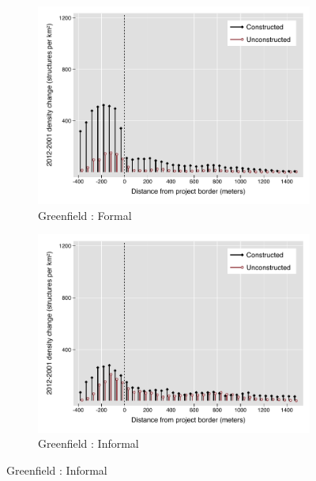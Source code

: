 \documentclass[12pt]{article}
\begin{document}
\begin{figure}
\caption{Separately by Project Type}
        \begin{subfigure}[b]{0.495\textwidth}
            \centering
        \caption{Greenfield : Formal}
            \includegraphics[width=\textwidth,trim={0.3cm .3cm 0.1cm 0cm}, clip=true]{figures/bblu_for_rawchanges_4_1}
        \end{subfigure}
        \hfill
        \begin{subfigure}[b]{0.495\textwidth}  
            \centering 
        \caption{Greenfield : Informal}
            \includegraphics[width=\textwidth,trim={0.3cm .3cm 0.1cm 0cm}, clip=true]{figures/bblu_inf_rawchanges_4_1.pdf}
        \end{subfigure}

\end{figure}
\end{document}
